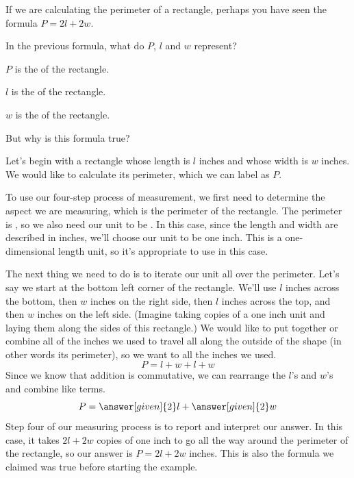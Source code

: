 \documentclass{ximera}
\begin{document}
If we are calculating the perimeter of a rectangle, perhaps you have seen the formula $P = 2l + 2w$.
\begin{question}
In the previous formula, what do $P$, $l$ and $w$ represent?

\begin{prompt}
$P$ is the  of the rectangle. 

$l$ is the  of the rectangle.

$w$ is the  of the rectangle. 
\end{prompt}
 \end{question}
 But why is this formula true?
\begin{example}
Let's begin with a rectangle whose length is $l$ inches and whose width is $w$ inches. We would like to calculate its perimeter, which we can label as $P$.
\begin{image}
\end{image}
To use our four-step process of measurement, we first need to determine the aspect we are measuring, which is the perimeter of the rectangle. The perimeter is , so we also need our unit to be . In this case, since the length and width are described in inches, we'll choose our unit to be one inch. This is a one-dimensional length unit, so it's appropriate to use in this case. 

The next thing we need to do is to iterate our unit all over the perimeter. Let's say we start at the bottom left corner of the rectangle. We'll use $l$ inches across the bottom, then $w$ inches on the right side, then $l$ inches across the top, and then $w$ inches on the left side. (Imagine taking copies of a one inch unit and laying them along the sides of this rectangle.) We would like to put together or combine all of the inches we used to travel all along the outside of the shape (in other words its perimeter), so we want to   all the inches we used.
\[
P = l + w + l + w
\]
Since we know that addition is commutative, we can rearrange the $l$'s and $w$'s and combine like terms.
\[
P = \answer[given]{2}l + \answer[given]{2}w
\]
Step four of our measuring process is to report and interpret our answer. In this case, it takes $2l + 2w$ copies of one inch to go all the way around the perimeter of the rectangle, so our answer is $P = 2l+2w$ inches. This is also the formula we claimed was true before starting the example.

\end{example}
\end{document}

